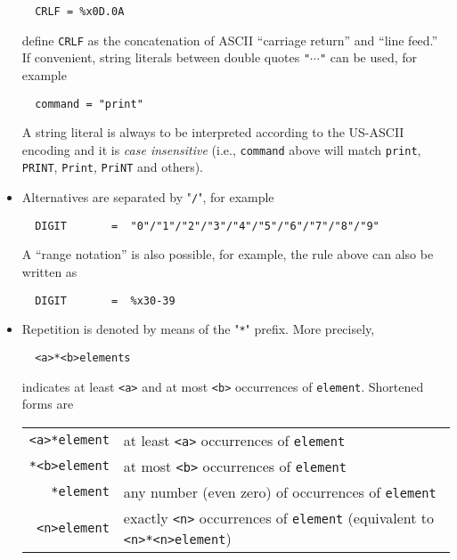 \documentclass{medusabook}
\begin{document}
\begin{itemize}
\begin{verbatim}
  CRLF = %x0D.0A
\end{verbatim}
%
define \texttt{CRLF} as the concatenation of ASCII ``carriage return''
and ``line feed.''  If convenient,  string literals between double
quotes \texttt{"$\cdots$"} can be used, for example
%
\begin{verbatim}
  command = "print"
\end{verbatim}
%
A string literal is always to be interpreted according to the US-ASCII
encoding and it is \emph{case insensitive} (i.e., \texttt{command}
above will match \texttt{print}, \texttt{PRINT}, \texttt{Print},
\texttt{PriNT} and others).
\item
Alternatives are separated by "\texttt{/}", for example
\begin{verbatim}
  DIGIT       =  "0"/"1"/"2"/"3"/"4"/"5"/"6"/"7"/"8"/"9"
\end{verbatim}
%
A ``range notation'' is also possible, for example, the rule above can
also be written as
\begin{verbatim}
  DIGIT       =  %x30-39
\end{verbatim}
\item
Repetition is denoted by means of the "\texttt{*}" prefix.  More
precisely, 
\begin{verbatim}
  <a>*<b>elements
\end{verbatim}
%
indicates at least \texttt{<a>} and at most \texttt{<b>} occurrences
of \texttt{element}.   Shortened forms are
\begin{center}
  \begin{tabular}{rp{}}
    \texttt{<a>*element} & at least \texttt{<a>} occurrences of
    \texttt{element} \\
    \texttt{*<b>element} & at most \texttt{<b>} occurrences of
    \texttt{element} \\
    \texttt{*element} & any number (even zero) of occurrences of
    \texttt{element} \\
    \texttt{<n>element} & exactly \texttt{<n>} occurrences of
    \texttt{element} (equivalent to \texttt{<n>*<n>element})\\
  \end{tabular}
\end{center}
\end{itemize}




\end{document}
